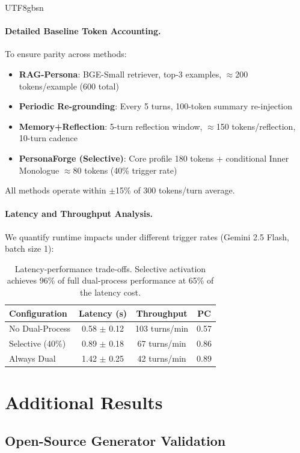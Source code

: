 \documentclass[11pt]{article}
\begin{document}
\begin{CJK*}{UTF8}{gbsn}
\paragraph{Detailed Baseline Token Accounting.} To ensure parity across methods:
\begin{itemize}
    \item \textbf{RAG-Persona}: BGE-Small retriever, top-3 examples, $\approx$200 tokens/example (600 total)
    \item \textbf{Periodic Re-grounding}: Every 5 turns, 100-token summary re-injection
    \item \textbf{Memory+Reflection}: 5-turn reflection window, $\approx$150 tokens/reflection, 10-turn cadence
    \item \textbf{PersonaForge (Selective)}: Core profile 180 tokens + conditional Inner Monologue $\approx$80 tokens (40\% trigger rate)
\end{itemize}
All methods operate within $\pm$15\% of 300 tokens/turn average.

\paragraph{Latency and Throughput Analysis.} We quantify runtime impacts under different trigger rates (Gemini 2.5 Flash, batch size 1):

\begin{table}[h]
\centering
\small
\begin{tabular}{lccc}
\toprule
\textbf{Configuration} & \textbf{Latency (s)} & \textbf{Throughput} & \textbf{PC} \\
\midrule
No Dual-Process & 0.58 $\pm$ 0.12 & 103 turns/min & 0.57 \\
Selective (40\%) & 0.89 $\pm$ 0.18 & 67 turns/min & 0.86 \\
Always Dual & 1.42 $\pm$ 0.25 & 42 turns/min & 0.89 \\
\bottomrule
\end{tabular}
\caption{Latency-performance trade-offs. Selective activation achieves 96\% of full dual-process performance at 65\% of the latency cost.}
\label{tab:latency}
\end{table}


\section{Additional Results}
\label{sec:additional_results}

\subsection{Open-Source Generator Validation}
\label{sec:opensource}


\end{CJK*}
\end{document}
